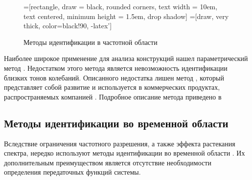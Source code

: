 \begin{figure}[H]
	\centering
	=[rectangle, draw = black, rounded corners, text width = 10em, text centered, minimum height = 1.5em, drop shadow]
	=[draw, very thick, color=black!90, -latex']
	\caption{Методы идентификации в частотной области} \label{fig:schemeFrequencyDomainOMA}
\end{figure}

Наиболее широкое применение для анализа конструкций нашел параметрический метод  \cite{lib:oma:Guillaume}. Недостатком этого метода является невозможность идентификации близких тонов колебаний. Описанного недостатка лишен метод , который представляет собой развитие  и используется в коммерческих продуктах, распространяемых компанией . Подробное описание метода приведено в \cite{lib:oma:Peeters&Auweraer}

\subsection{Методы идентификации во временной области}

Вследствие ограничения частотного разрешения, а также эффекта растекания спектра, нередко используют методы идентификации во временной области . Их дополнительным преимуществом является отсутствие необходимости определения передаточных функций системы.


